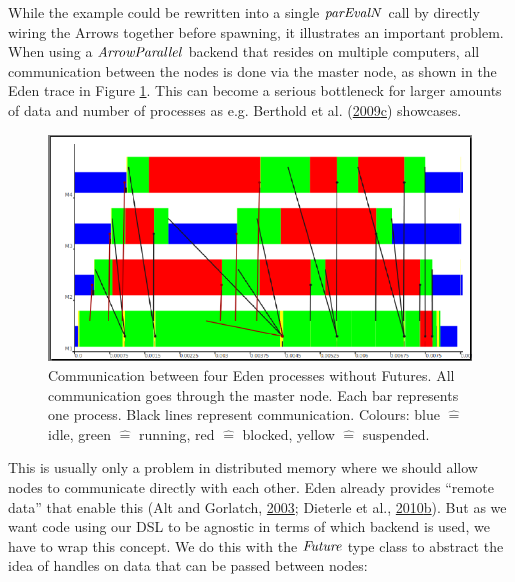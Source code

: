 \documentclass[paper=A4,twoside=true,openright,parskip=full,chapterprefix=true,headings=normal,bibliography=totoc,listof=totoc,titlepage=on,captions=tableabove,draft=false,british]{scrreprt}%
\renewcommand{\enquote}[1]{{``}#1{''}}
\begin{document}
While the example could be rewritten into a single \ensuremath{\Varid{parEvalN}} call by
directly wiring the Arrows together before spawning, it illustrates an
important problem. When using a \ensuremath{\Conid{ArrowParallel}} backend that resides on
multiple computers, all communication between the nodes is done via the
master node, as shown in the Eden trace in Figure
\ref{fig:withoutFutures}. This can become a serious bottleneck for
larger amounts of data and number of processes as e.g. Berthold et al.
(\protect\hyperlink{ref-Berthold2009-fft}{2009}\protect\hyperlink{ref-Berthold2009-fft}{c})
showcases.

\begin{figure}
\centering
\includegraphics{src/img/withoutFutures.pdf}
\caption[Communication between four Eden processes without Futures.]{Communication between four Eden processes without Futures. All
communication goes through the master node. Each bar represents one
process. Black lines represent communication. Colours: blue \(\hat{=}\)
idle, green \(\hat{=}\) running, red \(\hat{=}\) blocked, yellow
\(\hat{=}\) suspended.\label{fig:withoutFutures}}
\end{figure}

This is usually only a problem in distributed memory where we should
allow nodes to communicate directly with each other. Eden already
provides \enquote{remote data} that enable this (Alt and Gorlatch,
\protect\hyperlink{ref-AlGo03a}{2003}; Dieterle et al.,
\protect\hyperlink{ref-Dieterle2010}{2010}\protect\hyperlink{ref-Dieterle2010}{b}).
But as we want code using our DSL to be agnostic in terms of which
backend is used, we have to wrap this concept. We do this with the
\ensuremath{\Conid{Future}} type class to abstract the idea of handles on data that can be
passed between nodes:
\end{document}
